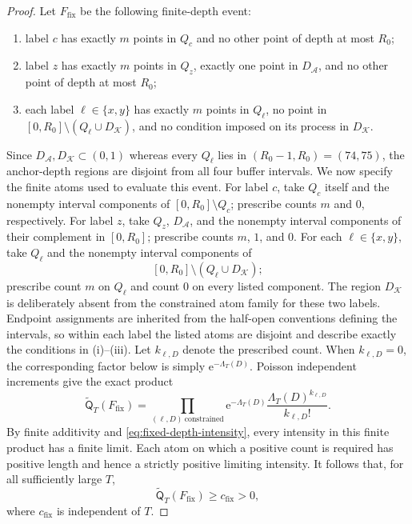 \documentclass[11pt]{article}
\numberwithin{equation}{section}
\theoremstyle{plain}
\newcommand{\1}{\mathbf 1}
\newcommand{\e}{\mathrm e}
\begin{document}
\begin{proof}
Let $F_{\mathrm{fix}}$ be the following finite-depth event:
\begin{enumerate}[label=(\roman*)]
 \item label $c$ has exactly $m$ points in $Q_c$ and no other point of
       depth at most $R_0$;
 \item label $z$ has exactly $m$ points in $Q_z$, exactly one point in
       $D_{\mathcal A}$, and no other point of depth at most $R_0$;
 \item each label $\ell\in\{x,y\}$ has exactly $m$ points in $Q_\ell$,
       no point in
       $[0,R_0]\setminus(Q_\ell\cup D_{\mathcal K})$, and no condition
       imposed on its process in $D_{\mathcal K}$.
\end{enumerate}
Since $D_{\mathcal A},D_{\mathcal K}\subset(0,1)$ whereas every $Q_\ell$
lies in $(R_0-1,R_0)=(74,75)$, the anchor-depth regions are disjoint from
all four buffer intervals.
We now specify the finite atoms used to evaluate this event.  For label
$c$, take $Q_c$ itself and the nonempty interval components of
$[0,R_0]\setminus Q_c$; prescribe counts $m$ and $0$, respectively.  For
label $z$, take $Q_z$, $D_{\mathcal A}$, and the nonempty interval
components of their complement in $[0,R_0]$; prescribe counts
$m$, $1$, and $0$.  For each $\ell\in\{x,y\}$, take $Q_\ell$ and the
nonempty interval components of
\[
 [0,R_0]\setminus(Q_\ell\cup D_{\mathcal K});
\]
prescribe count $m$ on $Q_\ell$ and count $0$ on every listed component.
The region $D_{\mathcal K}$ is deliberately absent from the constrained
atom family for these two labels.  Endpoint assignments are inherited
from the half-open conventions defining the intervals, so within each
label the listed atoms are disjoint and describe exactly the conditions
in (i)--(iii).  Let $k_{\ell,D}$ denote the prescribed count.  When
$k_{\ell,D}=0$, the corresponding factor below is simply
$\e^{-\Lambda_T(D)}$.
Poisson independent increments give the exact product
\begin{equation}\label{eq:fixed-event-product}
 \widetilde{\mathsf Q}_T(F_{\mathrm{fix}})
 =
 \prod_{(\ell,D)\ \mathrm{constrained}}
 \e^{-\Lambda_T(D)}
 \frac{\Lambda_T(D)^{k_{\ell,D}}}{k_{\ell,D}!}.
\end{equation}
By finite additivity and \eqref{eq:fixed-depth-intensity}, every intensity
in this finite product has a finite limit.  Each atom on which a positive
count is required has positive length and hence a strictly positive
limiting intensity.  It follows that, for all sufficiently large $T$,
\begin{equation}\label{eq:fixed-event-lower}
 \widetilde{\mathsf Q}_T(F_{\mathrm{fix}})
 \ge c_{\mathrm{fix}}>0,
\end{equation}
where $c_{\mathrm{fix}}$ is independent of $T$.


\end{proof}
\end{document}
